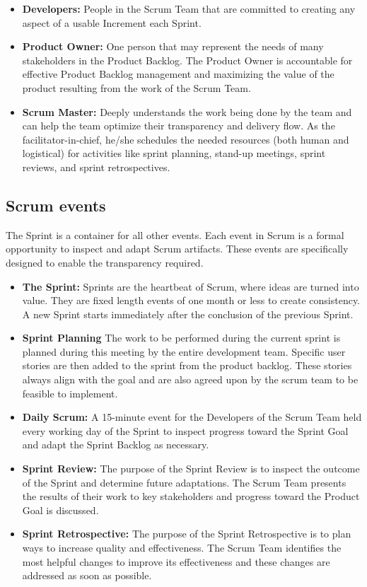 \begin{itemize}
      \item \textbf{Developers:} People in the Scrum Team that are committed to creating any aspect
            of a usable Increment each Sprint.
      \item \textbf{Product Owner:} One person that may represent the needs of many stakeholders
            in the Product Backlog. The Product Owner is accountable for effective Product Backlog management
            and maximizing the value of the product resulting from the work of the Scrum Team.
      \item \textbf{Scrum Master:} Deeply understands the work being done by the team and
            can help the team optimize their transparency and delivery flow. As the facilitator-in-chief,
            he/she schedules the needed resources (both human and logistical) for activities like sprint
            planning, stand-up meetings, sprint reviews, and sprint retrospectives.
\end{itemize}
\raggedbottom

\subsection{Scrum events}
The Sprint is a container for all other events. Each event in Scrum is a formal opportunity to inspect
and adapt Scrum artifacts. These events are specifically designed to enable the transparency required.

\begin{itemize}
      \item \textbf{The Sprint:} Sprints are the heartbeat of Scrum, where ideas are turned into value.
            They are fixed length events of one month or less to create consistency. A new Sprint starts
            immediately after the conclusion of the previous Sprint.
      \item \textbf{Sprint Planning} The work to be performed during the current sprint is planned during
            this meeting by the entire development team. Specific user stories are then added to the sprint from
            the product backlog. These stories always align with the goal and are also agreed upon by the scrum
            team to be feasible to implement.
      \item \textbf{Daily Scrum:} A 15-minute event for the Developers of the Scrum Team
            held every working day of the Sprint to inspect progress toward the Sprint Goal and adapt the Sprint
            Backlog as necessary.
      \item \textbf{Sprint Review:} The purpose of the Sprint Review is to inspect the outcome of the
            Sprint and determine future adaptations. The Scrum Team presents the results of their work to key
            stakeholders and progress toward the Product Goal is discussed.
      \item \textbf{Sprint Retrospective:} The purpose of the Sprint Retrospective is to plan ways to
            increase quality and effectiveness. The Scrum Team identifies the most helpful changes to improve
            its effectiveness and these changes are addressed as soon as possible.
\end{itemize}



